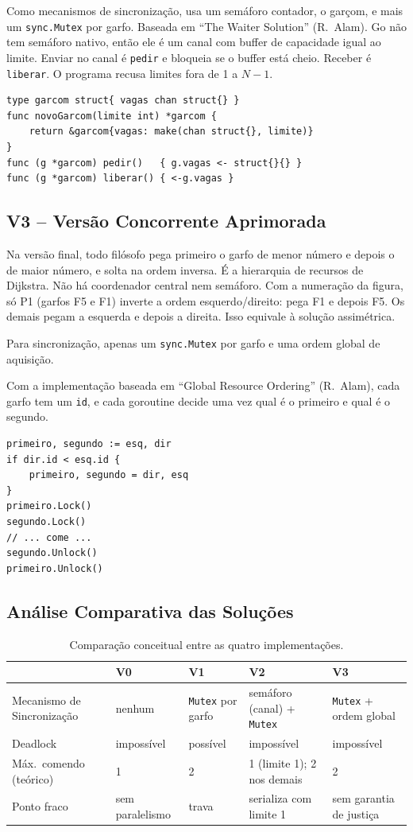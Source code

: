 \documentclass[12pt,brazil,a4paper]{article}
\begin{document}
Como mecanismos de sincronização, usa um semáforo contador, o garçom, e mais um \texttt{sync.Mutex} por garfo. Baseada em ``The Waiter Solution'' (R.~Alam). Go não tem semáforo nativo, então ele é um canal com buffer de capacidade igual ao limite. Enviar no canal é \texttt{pedir} e bloqueia se o buffer está cheio. Receber é \texttt{liberar}. O programa recusa limites fora de 1 a $N-1$.

\begin{lstlisting}
type garcom struct{ vagas chan struct{} }
func novoGarcom(limite int) *garcom {
    return &garcom{vagas: make(chan struct{}, limite)}
}
func (g *garcom) pedir()   { g.vagas <- struct{}{} }
func (g *garcom) liberar() { <-g.vagas }
\end{lstlisting}

\subsection{V3 -- Versão Concorrente Aprimorada}
Na versão final, todo filósofo pega primeiro o garfo de menor número e depois o de maior número, e solta na ordem inversa. É a hierarquia de recursos de Dijkstra. Não há coordenador central nem semáforo. Com a numeração da figura, só P1 (garfos F5 e F1) inverte a ordem esquerdo/direito: pega F1 e depois F5. Os demais pegam a esquerda e depois a direita. Isso equivale à solução assimétrica.

Para sincronização, apenas um \texttt{sync.Mutex} por garfo e uma ordem global de aquisição.

Com a implementação baseada em ``Global Resource Ordering'' (R.~Alam), cada garfo tem um \texttt{id}, e cada goroutine decide uma vez qual é o primeiro e qual é o segundo.

\begin{lstlisting}
primeiro, segundo := esq, dir
if dir.id < esq.id {
    primeiro, segundo = dir, esq
}
primeiro.Lock()
segundo.Lock()
// ... come ...
segundo.Unlock()
primeiro.Unlock()
\end{lstlisting}

\subsection{Análise Comparativa das Soluções}

\begin{table}[H]
\centering
\small
\begin{tabular}{p{2.3cm}p{3.2cm}p{3.2cm}p{3.6cm}p{3cm}}
\toprule
 & V0 & V1 & V2 & V3\\
\midrule
Mecanismo de Sincronização & nenhum & \texttt{Mutex} por garfo & semáforo (canal) + \texttt{Mutex} & \texttt{Mutex} + ordem global\\
Deadlock & impossível & possível & impossível & impossível\\
Máx.\ comendo (teórico) & 1 & 2 & 1 (limite 1); 2 nos demais & 2\\
Ponto fraco & sem paralelismo & trava & serializa com limite 1 & sem garantia de justiça\\
\bottomrule
\end{tabular}
\caption{Comparação conceitual entre as quatro implementações.}
\label{tab:comparacao-solucoes}
\end{table}
\end{document}
